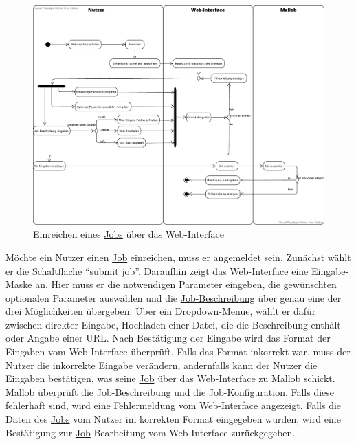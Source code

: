 \begin{figure}[H]
    \centering
    \includegraphics[width=\textwidth]{images-interface/v3_aktivitaetsdiagramme/Job_einreichen_v11.pdf}
    \caption{Einreichen eines \hyperref[B:Jobs]{Jobs} über das \gls{Web-Interface}}
\end{figure}
Möchte ein \gls{Nutzer} einen \hyperref[B:Jobs]{Job} einreichen, muss er angemeldet sein. Zunächst wählt er die Schaltfläche \enquote{submit job}. Daraufhin zeigt das \gls{Web-Interface} eine \hyperref[pages:submit-job]{Eingabe-Maske} an. Hier muss er die notwendigen Parameter eingeben, die gewünschten optionalen Parameter auswählen und die \hyperref[B:Job-Beschreibung]{Job-Beschreibung} über genau eine der drei Möglichkeiten übergeben. Über ein \gls{Dropdown-Menue}, wählt er dafür zwischen direkter Eingabe, Hochladen einer Datei, die die Beschreibung enthält oder Angabe einer \gls{URL}. Nach Bestätigung der Eingabe wird das Format der Eingaben vom \gls{Web-Interface} überprüft. Falls das Format inkorrekt war, muss der \gls{Nutzer} die inkorrekte Eingabe verändern, andernfalls kann der \gls{Nutzer} die Eingaben bestätigen, was seine \hyperref[B:Jobs]{Job} über das \gls{Web-Interface} zu \gls{Mallob} schickt. \gls{Mallob} überprüft die \hyperref[B:Job-Beschreibung]{Job-Beschreibung} und die \hyperref[B:Job-Konfiguration]{Job-Konfiguration}. Falls diese fehlerhaft sind, wird eine Fehlermeldung vom \gls{Web-Interface} angezeigt. Falls die Daten des \hyperref[B:Jobs]{Jobs} vom \gls{Nutzer} im korrekten Format eingegeben wurden, wird eine Bestätigung zur \hyperref[B:Jobs]{Job}-Bearbeitung vom \gls{Web-Interface} zurückgegeben.

